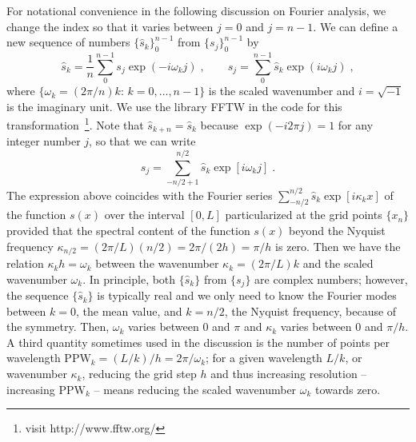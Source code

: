 For notational convenience in the following discussion on Fourier analysis, we change the index so that it varies between $j=0$ and $j=n-1$. We can define a new sequence of numbers $\{\hat{s}_k\}_0^{n-1}$ from $\{s_j\}_0^{n-1}$ by
\begin{equation}
\hat{s}_k=\frac{1}{n}\sum_0^{n-1}s_j\exp(-i\omega_kj)\;,\qquad
s_j=\sum_0^{n-1}\hat{s}_k\exp(i\omega_kj)\;,
\label{equ:dft}
\end{equation}
where $\{\omega_k=(2\pi/n)k:\, k = 0,\ldots,n-1\}$ is the scaled wavenumber and $i=\sqrt{-1}$ is the imaginary unit. We use the library FFTW in the code for this transformation~\footnote{visit {http://www.fftw.org/}}. Note that $\hat{s}_{k+n}=\hat{s}_k$ because $\exp(-i2\pi j)=1$ for any integer number $j$, so that we can write
\begin{equation}
  s_j =  \sum_{-n/2+1}^{n/2} \hat{s}_k \exp[i\omega_kj]\;.  
\end{equation}
The expression above coincides with the Fourier series $\sum_{-n/2}^{n/2} \hat{s}_k \exp[i\kappa_kx]$ of the function $s(x)$ over the interval $[0,L]$ particularized at the grid points $\{x_n\}$ provided that the spectral content of the function $s(x)$ beyond the Nyquist frequency $\kappa_{n/2}=(2\pi/L)(n/2)=2\pi/(2h)=\pi/h$ is zero. Then we have the relation $\kappa_kh=\omega_k$ between the wavenumber $\kappa_k=(2\pi/L)k$ and the scaled wavenumber $\omega_k$. In principle, both $\{\hat{s}_k\}$ from $\{s_j\}$ are complex numbers; however, the sequence $\{\hat{s}_k\}$ is typically real and we only need to know the Fourier modes between $k=0$, the mean value, and $k=n/2$, the Nyquist frequency, because of the symmetry. Then, $\omega_k$ varies between 0 and $\pi$ and $\kappa_k$ varies between 0 and $\pi/h$. A third quantity sometimes used in the discussion is the number of points per wavelength $\mathrm{PPW}_k=(L/k)/h=2\pi/\omega_k$; for a given wavelength $L/k$, or wavenumber $\kappa_k$, reducing the grid step $h$ and thus increasing resolution -- increasing $\mathrm{PPW}_k$ -- means reducing the scaled wavenumber $\omega_k$ towards zero.


